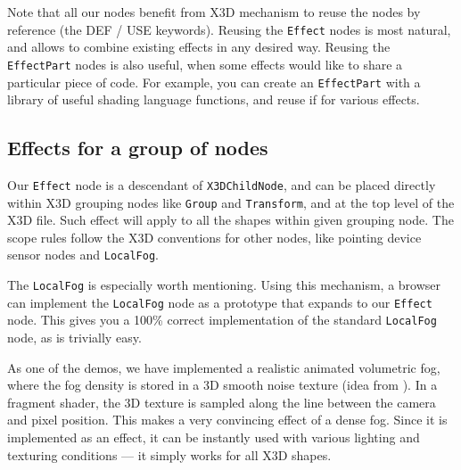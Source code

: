 \documentclass{acmsiggraph}                     %
\begin{document}
Note that all our nodes benefit from X3D mechanism to reuse the nodes
by reference (the DEF / USE keywords). Reusing the \texttt{Effect} nodes
is most natural, and allows to combine existing effects in any desired way.
Reusing the \texttt{EffectPart} nodes is also useful, when some effects
would like to share a particular piece of code. For example,
you can create an \texttt{EffectPart} with a library of useful
shading language functions, and reuse if for various effects.

\subsection{Effects for a group of nodes}

Our \texttt{Effect} node is a descendant of \texttt{X3DChildNode},
and can be placed directly within X3D grouping nodes like
\texttt{Group} and \texttt{Transform}, and at the top level of the X3D file.
Such effect will apply to all the shapes within given grouping node.
The scope rules follow the X3D conventions for other nodes,
like pointing device sensor nodes and \texttt{LocalFog}.

The \texttt{LocalFog} is especially worth mentioning. Using this mechanism,
a browser can implement the \texttt{LocalFog} node as a prototype
that expands to our \texttt{Effect} node. This gives you a 100\% correct
implementation of the standard \texttt{LocalFog} node, as is trivially easy.

As one of the demos, we have implemented a realistic
animated volumetric fog, where the fog density is stored in
a 3D smooth noise texture (idea from \cite{humus:volumetricfog}).
In a fragment shader, the 3D texture is sampled
along the line between the camera and pixel position. This makes a very
convincing effect of a dense fog. Since it is implemented as an effect,
it can be instantly used with various lighting and texturing conditions
--- it simply works for all X3D shapes.
\end{document}
